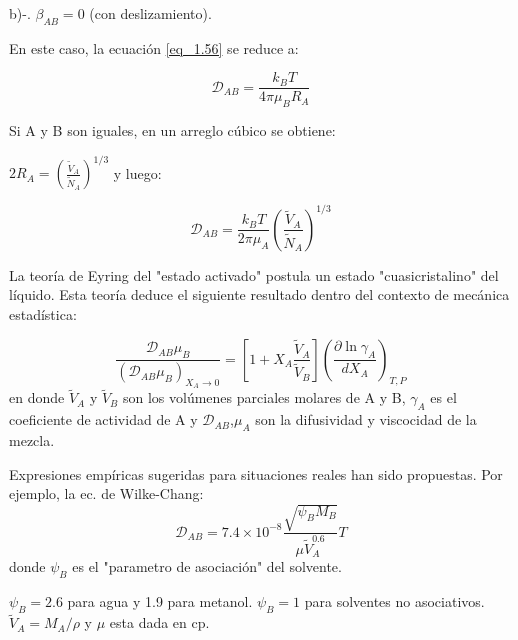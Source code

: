 b)-. \( \beta_{AB} = 0 \) (con deslizamiento).  

   En este caso, la ecuación \ref{eq_1.56} se reduce a:

   \begin{equation}
   \mathscr{D}_{AB} = \frac{k_B T}{4 \pi \mu_B R_A}\tag{1.59}\label{eq_1.59}
   \end{equation}

Si A y B son iguales, en un arreglo cúbico se obtiene:


$2 R_A = \left( \frac{\widetilde{V}_A}{\widetilde{N}_A} \right)^{1/3}$ y luego:

\begin{equation}
\mathscr{D}_{AB} = \frac{k_B T}{2 \pi \mu_A} \left( \frac{\widetilde{V}_A}{\widetilde{N}_A} \right)^{1/3}\tag{1.60}\label{eq_1.60}
\end{equation}

La teoría de Eyring del "estado activado" postula un estado "cuasicristalino" del líquido. Esta teoría deduce el siguiente resultado dentro del contexto de mecánica estadística:

\begin{equation}
\frac{\mathscr{D}_{AB} \mu_B}{(\mathscr{D}_{AB}\mu_B)_{X_A \to 0}} = \left[ 1 + X_A \frac{\widetilde{V}_A}{\widetilde{V}_B} \right] \left( \frac{\partial \ln \gamma_{A}}{d X_A} \right)_{T,P}\tag{1.61}\label{eq_1.61}
\end{equation}
en donde $\widetilde{V}_A$ y $\widetilde{V}_B$ son los volúmenes parciales molares de A y B, $\gamma_A$ es el coeficiente de actividad de A y $\mathscr{D}_{AB}$,$\mu_A$ son la difusividad y viscocidad de la mezcla.

Expresiones empíricas sugeridas para situaciones reales han sido propuestas. Por ejemplo, la ec. de Wilke-Chang:
\begin{equation}
    \mathscr{D}_{AB}=7.4\times10^{-8}\frac{\sqrt{\psi_BM_B}}{\mu \widetilde{V}_A^{0.6}}T
\tag{1.62}\label{eq_1.62}
\end{equation}
donde $\psi_B$ es el "parametro de asociación" del solvente.

$\psi_B=2.6$ para agua y 1.9 para metanol.
$\psi_B=1$ para solventes no asociativos. $\widetilde{V}_A=M_A/\rho$ y $\mu$ esta dada en cp.



  
